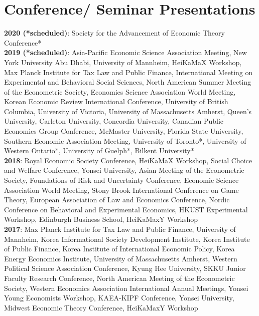 \documentclass[margin, letterpaper]{res}
\begin{document}
\begin{resume}
\begin{itemize}
\end{itemize}

\section{Conference/ Seminar Presentations}
\textbf{2020 (*scheduled)}: Society for the Advancement of Economic Theory Conference*\\
\textbf{2019 (*scheduled)}: Asia-Pacific Economic Science Association Meeting, New York University Abu Dhabi, University of Mannheim, HeiKaMaX Workshop, Max Planck Institute for Tax Law and Public Finance, International Meeting on Experimental and Behavioral Social Sciences, North American Summer Meeting of the Econometric Society, Economics Science Association World Meeting, Korean Economic Review International Conference, University of British Columbia, University of Victoria, University of Massachusetts Amherst, Queen's University, Carleton University, Concordia University, Canadian Public Economics Group Conference, McMaster University, Florida State University, Southern Economic Association Meeting, University of Toronto*, University of Western Ontario*, University of Guelph*, Bilkent University*\\
\textbf{2018}: Royal Economic Society Conference, HeiKaMaX Workshop, Social Choice and Welfare Conference, Yonsei University, Asian Meeting of the Econometric Society, Foundations of Risk and Uncertainty Conference, Economic Science Association World Meeting, Stony Brook International Conference on Game Theory, European Association of Law and Economics Conference, Nordic Conference on Behavioral and Experimental Economics, HKUST Experimental Workshop, Edinburgh Business School, HeiKaMaxY Workshop\\
\textbf{2017}: Max Planck Institute for Tax Law and Public Finance, University of Mannheim, Korea Informational Society Development Institute, Korea Institute of Public Finance, Korea Institute of International Economic Policy, Korea Energy Economics Institute, University of Massachusetts Amherst, Western Political Science Association Conference, Kyung Hee University, SKKU Junior Faculty Research Conference, North American Meeting of the Econometric Society, Western Economics Association International Annual Meetings, Yonsei Young Economists Workshop, KAEA-KIPF Conference, Yonsei University, Midwest Economic Theory Conference, HeiKaMaxY Workshop\\

\end{resume}
\end{document}
